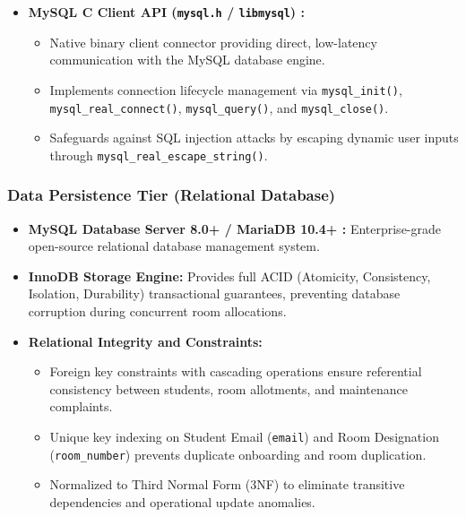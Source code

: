 \documentclass[12pt,a4paper]{article}
\begin{document}
\begin{itemize}
\begin{itemize}
        \item Single-header, intuitive JSON construction allowing direct mapping between relational SQL tuples and RESTful JSON payloads.
        \item Provides type-safe casting, deserialization error trapping, and structured payload extraction.
    \end{itemize}
    \item \textbf{MySQL C Client API (\texttt{mysql.h} / \texttt{libmysql}) \cite{mysql}:}
    \begin{itemize}
        \item Native binary client connector providing direct, low-latency communication with the MySQL database engine.
        \item Implements connection lifecycle management via \texttt{mysql\_init()}, \texttt{mysql\_real\_connect()}, \texttt{mysql\_query()}, and \texttt{mysql\_close()}.
        \item Safeguards against SQL injection attacks by escaping dynamic user inputs through \texttt{mysql\_real\_escape\_string()}.
    \end{itemize}
\end{itemize}

\subsubsection{Data Persistence Tier (Relational Database)}
\begin{itemize}
    \item \textbf{MySQL Database Server 8.0+ / MariaDB 10.4+ \cite{mysql}:} Enterprise-grade open-source relational database management system.
    \item \textbf{InnoDB Storage Engine:} Provides full ACID (Atomicity, Consistency, Isolation, Durability) transactional guarantees, preventing database corruption during concurrent room allocations.
    \item \textbf{Relational Integrity and Constraints:}
    \begin{itemize}
        \item Foreign key constraints with cascading operations ensure referential consistency between students, room allotments, and maintenance complaints.
        \item Unique key indexing on Student Email (\texttt{email}) and Room Designation (\texttt{room\_number}) prevents duplicate onboarding and room duplication.
        \item Normalized to Third Normal Form (3NF) to eliminate transitive dependencies and operational update anomalies.
    \end{itemize}
\end{itemize}
\end{document}
